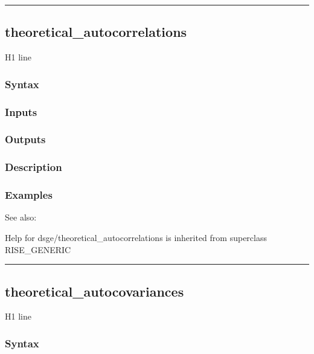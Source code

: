 \documentclass[letterpaper,10pt,english]{sphinxmanual}
\begin{document}
\bigskip\hrule{}\bigskip



\subsection{theoretical\_autocorrelations}
\label{classes/models/@dsge/dsge:theoretical-autocorrelations}\label{classes/models/@dsge/dsge:id197}
H1 line


\subsubsection{Syntax}
\label{classes/models/@dsge/dsge:id198}

\subsubsection{Inputs}
\label{classes/models/@dsge/dsge:id199}

\subsubsection{Outputs}
\label{classes/models/@dsge/dsge:id200}

\subsubsection{Description}
\label{classes/models/@dsge/dsge:id201}

\subsubsection{Examples}
\label{classes/models/@dsge/dsge:id202}
See also:

Help for dsge/theoretical\_autocorrelations is inherited from superclass RISE\_GENERIC


\bigskip\hrule{}\bigskip



\subsection{theoretical\_autocovariances}
\label{classes/models/@dsge/dsge:id203}\label{classes/models/@dsge/dsge:theoretical-autocovariances}
H1 line


\subsubsection{Syntax}
\label{classes/models/@dsge/dsge:id204}
\end{document}
